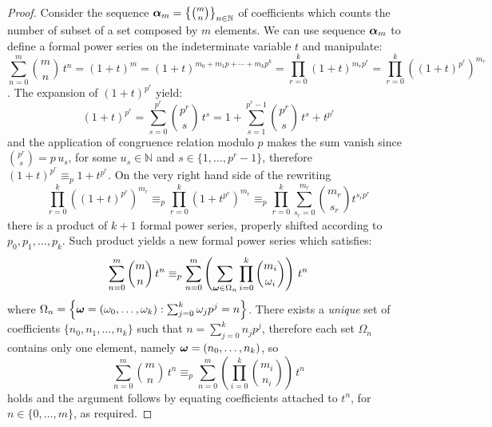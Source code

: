 \begin{proof}
    Consider the sequence $\boldsymbol{\alpha}_{m}=\left\lbrace{{m}\choose{n}}\right\rbrace_{n\in\mathbb{N}}$ 
    of coefficients which counts the number of subset
    of a set composed by $m$ elements. We can use sequence $\boldsymbol{\alpha}_{m}$ to define a 
    formal power series on the indeterminate variable $t$ and manipulate:
    \begin{displaymath}
            \sum_{n=0}^{m}{{{m}\choose{n}}\,t^{n}} %
                = \left(1+t\right)^{m}
                = \left(1+t\right)^{m_{0}+m_{1}p+\cdots+m_{k}p^{k}}%
                = \prod_{r=0}^{k}{{\left(1+t\right)^{m_{r}p^{r}}}}
                = \prod_{r=0}^{k}{\left(\left(1+t\right)^{p^{r}}\right)^{m_{r}}}
    \end{displaymath}. The expansion of $\left(1+t\right)^{p^{r}}$ yield: 
    \begin{displaymath}
            \left(1+t\right)^{p^{r}} = \sum_{s=0}^{p^{r}}{{{p^{r}}\choose{s}}\,t^{s}}
                = 1+\sum_{s=1}^{p^{r}-1}{{{p^{r}}\choose{s}}\,t^{s}}+t^{p^{r}}
    \end{displaymath}
    and the application of congruence relation modulo $p$ makes the sum vanish since ${{p^{r}}\choose{s}}=p\,u_{s}$,
    for some $u_{s}\in\mathbb{N}$ and $s\in\lbrace 1,\ldots,p^{r}-1\rbrace$, 
    therefore $\left(1+t\right)^{p^{r}} \equiv_{p} 1+t^{p^{r}}$. On the very right hand side of 
    the rewriting
    \begin{displaymath}
            \prod_{r=0}^{k}{\left(\left(1+t\right)^{p^{r}}\right)^{m_{r}}}
                \equiv_{p} \prod_{r=0}^{k}{\left(1+t^{p^{r}}\right)^{m_{r}}}
                \equiv_{p} \prod_{r=0}^{k}{\sum_{s_{r}=0}^{m_{r}}{{{m_{r}}\choose{s_{r}}}t^{s_{r}p^{r}}}}
    \end{displaymath}
    there is a product of $k+1$ formal power series, properly shifted according to 
    $p_{0},p_{1},\ldots,p_{k}$. Such product yields a new formal power series which satisfies:
    \begin{displaymath}
        \sum_{n=0}^{m}{{{m}\choose{n}}\,t^{n}} 
        \equiv_{p}
        \sum_{n=0}^{m}{\left(\sum_{\boldsymbol{\omega}\in\Omega_{n}}{\prod_{i=0}^{k}{{{m_{i}}\choose{\omega_{i}}}}}\right)\,t^{n}}
    \end{displaymath}
    where $\Omega_{n}=\left\lbrace\boldsymbol{\omega}=\left(\omega_{0},\ldots,\omega_{k}\right):
        \sum_{j=0}^{k}{\omega_{j}p^{j}}=n\right\rbrace$.
    There exists a \emph{unique} set of coefficients
    $\lbrace n_{0},n_{1},\ldots,n_{k}\rbrace$ such that $n=\sum_{j=0}^{k}{n_{j}p^{j}}$, therefore
    each set $\Omega_{n}$ contains only one element, namely $\boldsymbol{\omega}=(n_{0},\ldots,n_{k})$, so
    \begin{displaymath}
        \sum_{n=0}^{m}{{{m}\choose{n}}\,t^{n}} 
        \equiv_{p} \sum_{n=0}^{m}{\left({\prod_{i=0}^{k}{{{m_{i}}\choose{n_{i}}}}}\right)\,t^{n}}
    \end{displaymath}
    holds and the argument follows by equating coefficients attached to $t^{n}$, 
    for $n\in\lbrace0,\ldots,m\rbrace$, as required.


\end{proof}
